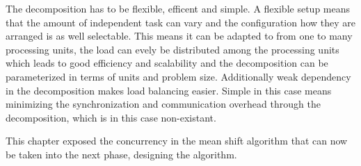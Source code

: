 The decomposition has to be flexible, efficent and simple. A flexible setup
means that the amount of independent task can vary and the configuration how
they are arranged is as well selectable. This means it can be adapted to from
one to many processing units, the load can evely be distributed among the
processing units which leads to good efficiency and scalability and the
decomposition can be parameterized in terms of units and problem size.
Additionally weak dependency in the decomposition makes load balancing easier.
Simple in this case means minimizing the synchronization and communication overhead
through the decomposition, which is in this case non-existant. 

This chapter exposed the concurrency in the mean shift algorithm that can now be
taken into the next phase, designing the algorithm. 

